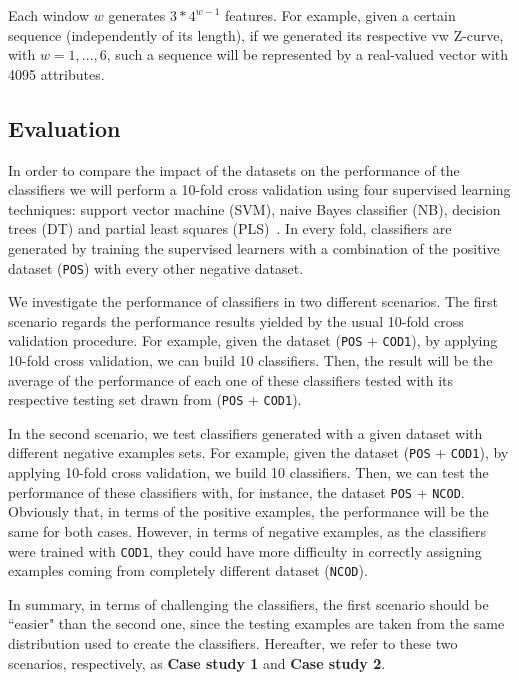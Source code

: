 \documentclass[conference]{IEEEtran}
\begin{document}
Each window $w$ generates $ 3*4^{w-1} $ features. For example, given a certain sequence (independently of its length), if we generated its respective vw Z-curve, with $ w = 1, ..., 6 $, such a sequence will be represented by a real-valued vector with 4095 attributes.

\subsection{Evaluation}

In order to compare the impact of the  datasets on the performance of the classifiers  we will perform a 10-fold cross validation using four supervised learning techniques: support vector machine (SVM), naive Bayes classifier (NB), decision trees (DT) and partial least squares (PLS)~\cite{song2011a,mitchell1997}. In every fold, classifiers are generated by training the supervised learners with a combination of the positive dataset ({\tt POS}) with every other negative dataset.

We investigate the performance of classifiers in two different scenarios. The first scenario regards the performance results yielded by the usual 10-fold cross validation procedure. For example, given the dataset ({\tt POS} + {\tt COD1}), by applying 10-fold cross validation, we can build 10 classifiers. Then, the result will be the average of the performance of each one of these classifiers tested with its respective testing set drawn from ({\tt POS} + {\tt COD1}).

In the second scenario, we test classifiers generated with a given dataset with different negative examples sets. For example, given the dataset ({\tt POS} + {\tt COD1}), by applying 10-fold cross validation, we build 10 classifiers. Then, we can test the performance of these classifiers with, for instance, the dataset {\tt POS} + {\tt NCOD}. Obviously that, in terms of the positive examples, the performance will be the same for both cases. However, in terms of negative examples, as the classifiers were trained with {\tt COD1}, they could have more difficulty in correctly assigning examples coming from completely different dataset ({\tt NCOD}).

In summary, in terms of challenging the classifiers, the first scenario should be ``easier" than the second one, since the testing examples are taken from the same distribution used to create the classifiers. Hereafter, we refer to these two scenarios, respectively, as {\bf Case study 1} and {\bf Case study 2}.
\end{document}
